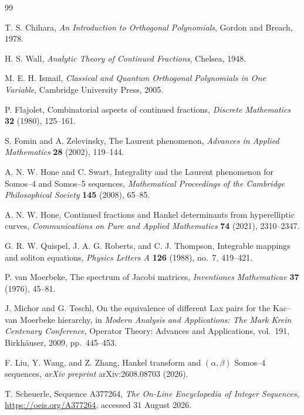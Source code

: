 \documentclass[11pt]{article}
\theoremstyle{remark}
\begin{document}
\begin{thebibliography}{99}

T. S. Chihara,
\emph{An Introduction to Orthogonal Polynomials},
Gordon and Breach, 1978.

H. S. Wall,
\emph{Analytic Theory of Continued Fractions},
Chelsea, 1948.

M. E. H. Ismail,
\emph{Classical and Quantum Orthogonal Polynomials in One Variable},
Cambridge University Press, 2005.

P. Flajolet,
Combinatorial aspects of continued fractions,
\emph{Discrete Mathematics} \textbf{32} (1980), 125--161.

S. Fomin and A. Zelevinsky,
The Laurent phenomenon,
\emph{Advances in Applied Mathematics} \textbf{28} (2002), 119--144.

A. N. W. Hone and C. Swart,
Integrality and the Laurent phenomenon for Somos--4 and Somos--5 sequences,
\emph{Mathematical Proceedings of the Cambridge Philosophical Society}
\textbf{145} (2008), 65--85.

A. N. W. Hone,
Continued fractions and Hankel determinants from hyperelliptic curves,
\emph{Communications on Pure and Applied Mathematics} \textbf{74} (2021), 2310--2347.

G. R. W. Quispel, J. A. G. Roberts, and C. J. Thompson,
Integrable mappings and soliton equations,
\emph{Physics Letters A} \textbf{126} (1988), no.~7, 419--421.

P. van Moerbeke,
The spectrum of Jacobi matrices,
\emph{Inventiones Mathematicae} \textbf{37} (1976), 45--81.

J. Michor and G. Teschl,
On the equivalence of different Lax pairs for the Kac--van Moerbeke hierarchy,
in \emph{Modern Analysis and Applications: The Mark Krein Centenary Conference},
Operator Theory: Advances and Applications, vol.~191,
Birkh\"auser, 2009, pp.~445--453.

F. Liu, Y. Wang, and Z. Zhang,
Hankel transform and $(\alpha,\beta)$ Somos--4 sequences,
\emph{arXiv preprint} arXiv:2608.08703 (2026).

T. Scheuerle,
Sequence A377264,
\emph{The On-Line Encyclopedia of Integer Sequences},
\url{https://oeis.org/A377264}, accessed 31 August 2026.

\end{thebibliography}
\end{document}
